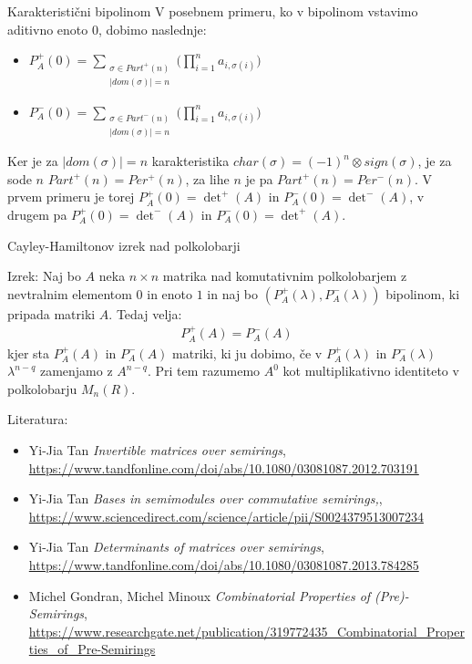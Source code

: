 \documentclass[t, 11pt]{beamer} %
\newcommand{\abs}[1]{\ensuremath{\lvert #1 \rvert}}
\newcommand{\fillblack}[1]{
\begin{tikzpicture}[remember picture, overlay]
    \node [shift={(0 cm,0cm)}]  at (current page.south west)
        {%
        \begin{tikzpicture}[remember picture, overlay] at (current page.south west)
            \draw [fill=black] (0, 0) -- (0,#1 \paperheight) --
                              (\paperwidth,#1 \paperheight) -- (\paperwidth,0) -- cycle ;
        \end{tikzpicture}
        };
        \draw (current page.north west) rectangle (current page.south east);
\end{tikzpicture}
}
\begin{document}
\begin{frame}{Karakteristični bipolinom}
	V posebnem primeru, ko v bipolinom vstavimo aditivno enoto $0$, dobimo naslednje: \begin{itemize}
		\item $P^{+}_A(0) = \sum_{\substack{\sigma\in Part^{+}(n)\\ \abs{dom(\sigma)} = n}} \big( \prod_{i=1}^{n}a_{i, \sigma(i)}\big)$
		\item $P^{-}_A(0) = \sum_{\substack{\sigma\in Part^{-}(n)\\\abs{dom(\sigma)} = n}}\big( \prod_{i=1}^{n}a_{i, \sigma(i)}\big)$
	\end{itemize}
Ker je za $\abs{dom(\sigma)} = n$ karakteristika $char(\sigma) = (-1)^n \otimes sign(\sigma)$, je za sode $n$ $Part^{+}(n) = Per^{+}(n)$, za lihe $n$ je pa $Part^{+}(n) = Per^{-}(n)$. \newline V prvem primeru je torej $P^{+}_A(0) = \det^{+}(A)$ in $P^{-}_A(0) = \det^{-}(A)$, v drugem pa $P^{+}_A(0) = \det^{-}(A)$ in $P^{-}_A(0) = \det^{+}(A)$.
\end{frame}

\begin{frame}{Cayley-Hamiltonov izrek nad polkolobarji}
	\begin{block}{Izrek:}
		Naj bo $A$ neka $n\times n$ matrika nad komutativnim polkolobarjem z nevtralnim elementom $0$ in enoto $1$ in naj bo $(P^{+}_A(\lambda), P^{-}_A(\lambda))$ bipolinom, ki pripada matriki $A$. Tedaj velja: \begin{align}
			P^{+}_A(A) = P^{-}_A(A)
		\end{align}
		kjer sta $P^{+}_A(A)$ in $P^{-}_A(A)$ matriki, ki ju dobimo, če v $P^{+}_A(\lambda)$ in $P^{-}_A(\lambda)$ $\lambda^{n-q}$ zamenjamo z $A^{n-q}$. Pri tem razumemo $A^0$ kot multiplikativno identiteto v polkolobarju $M_n(R)$.
	\end{block}
\end{frame}

\begin{frame}{Literatura:}
	\begin{itemize}
		\item Yi-Jia Tan {\em Invertible matrices over semirings}, \url{https://www.tandfonline.com/doi/abs/10.1080/03081087.2012.703191}

		\item Yi-Jia Tan {\em Bases in semimodules over commutative semirings,},	\url{https://www.sciencedirect.com/science/article/pii/S0024379513007234}
		
		\item Yi-Jia Tan {\em Determinants of matrices over semirings}, \url{https://www.tandfonline.com/doi/abs/10.1080/03081087.2013.784285}
		
		\item Michel Gondran, Michel Minoux {\em Combinatorial Properties of (Pre)-Semirings}, \url{https://www.researchgate.net/publication/319772435_Combinatorial_Properties_of_Pre-Semirings}
	\end{itemize}
\end{frame}
\end{document}
